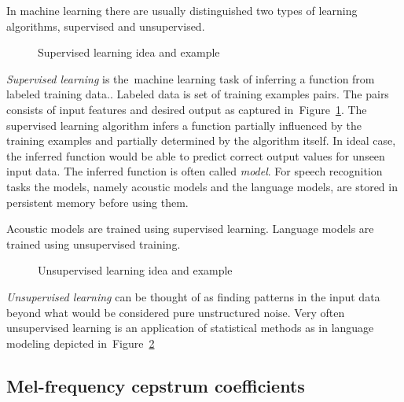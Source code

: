In machine learning there are usually distinguished two types of learning algorithms, supervised and unsupervised.

\begin{figure}[!htp]
    \begin{center}
    
    
    \caption{Supervised learning idea and example}
    \label{fig:supervised} 
    \end{center}
\end{figure}
{\it Supervised learning} is the~machine learning task of inferring a function from labeled training data.\cite{mohri2012foundations}. Labeled data is set of training examples pairs. The pairs consists of input features and desired output as captured in~Figure~\ref{fig:supervised}. The supervised learning algorithm infers a function partially influenced by the training examples and partially determined by the algorithm itself. In ideal case, the inferred function would be able to predict correct output values for unseen input data. 
The inferred function is often called {\it model}. For speech recognition tasks the models, namely acoustic models and the language models, are stored in persistent memory before using them. 

Acoustic models are trained using supervised learning. Language models are trained using unsupervised training. 

\begin{figure}[!htp]
    \begin{center}
    
    
    \caption{Unsupervised learning idea and example}
    \label{fig:unsupervised} 
    \end{center}
\end{figure}
{\it Unsupervised learning} can be thought of as finding patterns in the input data beyond what would be considered pure unstructured noise\cite{ghahramani2004unsupervised}. Very often unsupervised learning is an application of statistical methods as in language modeling depicted in~Figure~\ref{fig:unsupervised}







\subsection[MFCC coefficients]{Mel-frequency cepstrum coefficients}
\label{sub:mel_frequency_cepstrum_coefficients}



